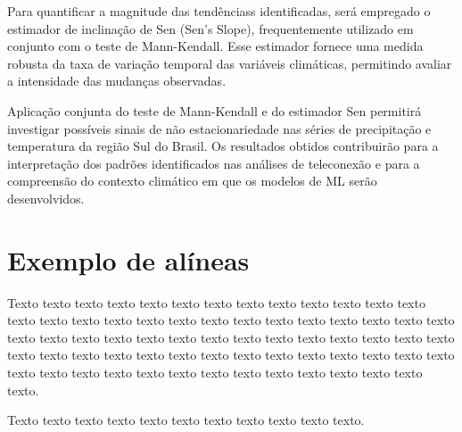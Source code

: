 	Para quantificar a magnitude das tendênciass identificadas, será empregado o estimador de inclinação de Sen (Sen's Slope), frequentemente utilizado em conjunto com o teste de Mann-Kendall.
	Esse estimador fornece uma medida robusta da taxa de variação temporal das variáveis climáticas, permitindo avaliar a intensidade das mudanças observadas.

	Aplicação conjunta do teste de Mann-Kendall e do estimador Sen permitirá investigar possíveis sinais de não estacionariedade nas séries de precipitação e temperatura da região Sul do Brasil.
	Os resultados obtidos contribuirão para a interpretação dos padrões identificados nas análises de teleconexão e para a compreensão do contexto climático em que os modelos de ML serão desenvolvidos.


\section{Exemplo de alíneas}\label{sec:exemplo-de-algoritmos-e-figuras}

    Texto texto texto texto texto texto texto texto texto texto texto texto texto texto texto texto texto texto texto texto texto texto texto texto texto texto texto texto texto texto texto texto texto texto texto texto texto texto texto texto texto texto texto texto texto texto texto texto texto texto texto texto texto texto texto texto texto texto texto texto texto texto texto texto texto texto texto texto texto.


    Texto texto texto texto texto texto texto texto texto texto texto.


